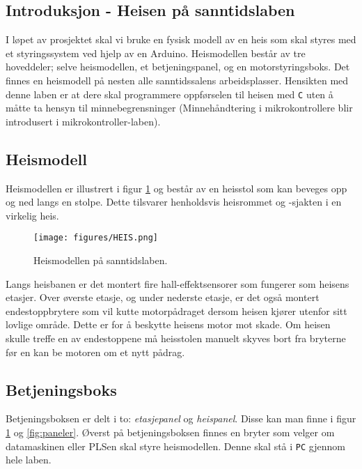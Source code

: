 \begin{alphasection}
\clearpage

\section{Introduksjon - Heisen på sanntidslaben}\label{sec:2-innføringheis}

I løpet av prosjektet skal vi bruke en fysisk modell av en heis som skal styres med et styringssystem ved hjelp av en Arduino. Heismodellen består av tre hoveddeler; selve heismodellen, et betjeningspanel, og en motorstyringsboks. Det finnes en heismodell på nesten alle sanntidssalens arbeidsplasser. Hensikten med denne laben er at dere skal programmere oppførselen til heisen med \verb|C| uten å måtte ta hensyn til minnebegrensninger (Minnehåndtering i mikrokontrollere blir introdusert i mikrokontroller-laben).



\subsection{Heismodell}
Heismodellen er illustrert i figur \ref{fig:heis-modell-sal} og består av en heisstol som kan beveges opp og ned langs en stolpe. Dette tilsvarer henholdsvis heisrommet og -sjakten i en virkelig heis.

\begin{figure}[ht]
    \centering
    \texttt{[image: figures/HEIS.png]}
    \caption{Heismodellen på sanntidslaben.}
    \label{fig:heis-modell-sal}
\end{figure}

Langs heisbanen er det montert fire hall-effektsensorer som fungerer som heisens etasjer. Over øverste etasje, og under nederste etasje, er det også montert endestoppbrytere som vil kutte motorpådraget dersom heisen kjører utenfor sitt lovlige område. Dette er for å beskytte heisens motor mot skade. Om heisen skulle treffe en av endestoppene må heisstolen manuelt skyves bort fra bryterne før en kan be motoren om et nytt pådrag.

\subsection{Betjeningsboks}
Betjeningsboksen er delt i to: \textit{etasjepanel} og \textit{heispanel}. Disse kan man finne i figur \ref{fig:heis-modell-sal} og \ref{fig:paneler}. Øverst på betjeningsboksen finnes en bryter som velger om datamaskinen eller PLSen skal styre heismodellen. Denne skal stå i \verb|PC| gjennom hele laben.


\end{alphasection}
